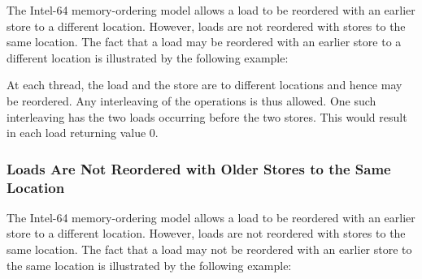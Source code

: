 The Intel-64 memory-ordering model allows a load to be reordered with an earlier store to a different location.
However, loads are not reordered with stores to the same location.
\bigbreak
\noindent
The fact that a load may be reordered with an earlier store to a different location is illustrated by the following example:

\begin{table}[!hbt]
\noindent{}
\caption{Loads May be Reordered with Older Stores \cite[Example 8-3]{ref:Intel}}
\label{tbl:litmus:intel:3}
\end{table}

\noindent
At each thread, the load and the store are to different locations and hence may be reordered.
Any interleaving of the operations is thus allowed.
One such interleaving has the two loads occurring before the two stores.
This would result in each load returning value 0.

\newpage

\subsubsection*{Loads Are Not Reordered with Older Stores to the Same Location}

The Intel-64 memory-ordering model allows a load to be reordered with an earlier store to a different location.
However, loads are not reordered with stores to the same location.
\bigbreak
\noindent
The fact that a load may not be reordered with an earlier store to the same location is illustrated by the following
example:

